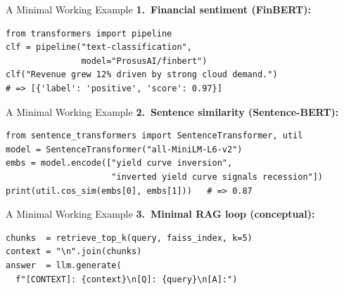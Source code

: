 \documentclass[11pt,aspectratio=169,professionalfonts]{beamer}
\begin{document}
%
%
\begin{frame}[fragile]{A Minimal Working Example}
  \textbf{1.\ Financial sentiment (FinBERT):}
\begin{lstlisting}
from transformers import pipeline
clf = pipeline("text-classification",
               model="ProsusAI/finbert")
clf("Revenue grew 12% driven by strong cloud demand.")
# => [{'label': 'positive', 'score': 0.97}]
\end{lstlisting}
\end{frame}
%
%
\begin{frame}[fragile]{A Minimal Working Example}
  \textbf{2.\ Sentence similarity (Sentence-BERT):}
\begin{lstlisting}
from sentence_transformers import SentenceTransformer, util
model = SentenceTransformer("all-MiniLM-L6-v2")
embs = model.encode(["yield curve inversion",
                     "inverted yield curve signals recession"])
print(util.cos_sim(embs[0], embs[1]))   # => 0.87
\end{lstlisting}
\end{frame}
%
%
\begin{frame}[fragile]{A Minimal Working Example}
  \textbf{3.\ Minimal RAG loop (conceptual):}
\begin{lstlisting}
chunks  = retrieve_top_k(query, faiss_index, k=5)
context = "\n".join(chunks)
answer  = llm.generate(
  f"[CONTEXT]: {context}\n[Q]: {query}\n[A]:")
\end{lstlisting}
\end{frame}
%
\end{document}
